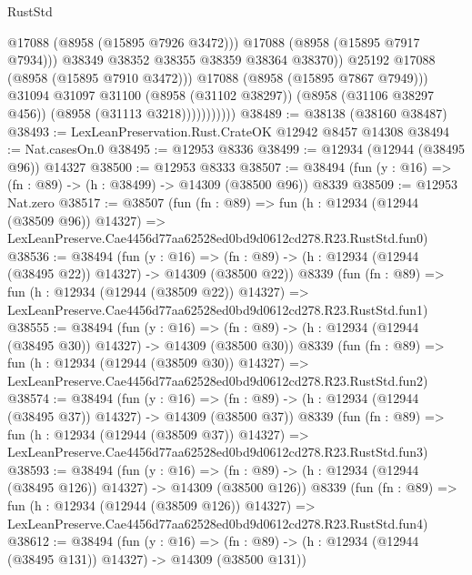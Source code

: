 \begin{lexlean}{RustStd}
\begin{coremodule}
                                  @17088
                                  (@8958 (@15895 @7926 @3472)))
                                @17088
                                (@8958 (@15895 @7917 @7934)))
                              @38349
                              @38352
                              @38355
                              @38359
                              @38364
                              @38370))
                          @25192
                          @17088
                          (@8958 (@15895 @7910 @3472)))
                        @17088
                        (@8958 (@15895 @7867 @7949)))
                      @31094
                      @31097
                      @31100
                      (@8958 (@31102 @38297))
                      (@8958 (@31106 @38297 @456))
                      (@8958 (@31113 @3218)))))))))))
@38489 := @38138 (@38160 @38487)
@38493 := LexLeanPreservation.Rust.CrateOK @12942 @8457 @14308
@38494 := Nat.casesOn.{0}
@38495 := @12953 @8336
@38499 := @12934 (@12944 (@38495 @96)) @14327
@38500 := @12953 @8333
@38507 := @38494 (fun (y : @16) => (fn : @89) -> (h : @38499) -> @14309 (@38500 @96)) @8339
@38509 := @12953 Nat.zero
@38517 := @38507
    (fun (fn : @89) =>
    fun (h : @12934 (@12944 (@38509 @96)) @14327) =>
    LexLeanPreserve.Cae4456d77aa62528ed0bd9d0612cd278.R23.RustStd.fun0)
@38536 := @38494
    (fun (y : @16) =>
    (fn : @89) -> (h : @12934 (@12944 (@38495 @22)) @14327) -> @14309 (@38500 @22))
    @8339
    (fun (fn : @89) =>
    fun (h : @12934 (@12944 (@38509 @22)) @14327) =>
    LexLeanPreserve.Cae4456d77aa62528ed0bd9d0612cd278.R23.RustStd.fun1)
@38555 := @38494
    (fun (y : @16) =>
    (fn : @89) -> (h : @12934 (@12944 (@38495 @30)) @14327) -> @14309 (@38500 @30))
    @8339
    (fun (fn : @89) =>
    fun (h : @12934 (@12944 (@38509 @30)) @14327) =>
    LexLeanPreserve.Cae4456d77aa62528ed0bd9d0612cd278.R23.RustStd.fun2)
@38574 := @38494
    (fun (y : @16) =>
    (fn : @89) -> (h : @12934 (@12944 (@38495 @37)) @14327) -> @14309 (@38500 @37))
    @8339
    (fun (fn : @89) =>
    fun (h : @12934 (@12944 (@38509 @37)) @14327) =>
    LexLeanPreserve.Cae4456d77aa62528ed0bd9d0612cd278.R23.RustStd.fun3)
@38593 := @38494
    (fun (y : @16) =>
    (fn : @89) -> (h : @12934 (@12944 (@38495 @126)) @14327) -> @14309 (@38500 @126))
    @8339
    (fun (fn : @89) =>
    fun (h : @12934 (@12944 (@38509 @126)) @14327) =>
    LexLeanPreserve.Cae4456d77aa62528ed0bd9d0612cd278.R23.RustStd.fun4)
@38612 := @38494
    (fun (y : @16) =>
    (fn : @89) -> (h : @12934 (@12944 (@38495 @131)) @14327) -> @14309 (@38500 @131))

\end{coremodule}
\end{lexlean}
